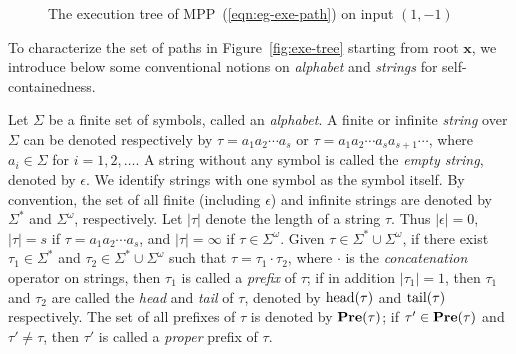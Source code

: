 \documentclass{article}
\newcommand{\head}{{\rm head}}
\newcommand{\tail}{{\rm tail}}
\newcommand{\xx}{\mathbf{x}}
\begin{document}
\begin{figure}
\begin{minipage}[t]{0.45\linewidth}

\caption{\small The execution tree of MPP~(\ref{eqn:eg-exe-path}) on input $(1,-1)$}\label{fig:exe-path}
\end{minipage}
\end{figure}

To characterize the set of paths in Figure~\ref{fig:exe-tree} starting from root $\xx$, we introduce below some conventional notions on \emph{alphabet} and \emph{strings} for self-containedness.

Let $\Sigma$ be a finite set of symbols, called an \emph{alphabet}. A finite or infinite \emph{string} over $\Sigma$ can be denoted respectively by $\tau=a_1a_2 \cdots a_s$ or $\tau=a_1a_2 \cdots a_s a_{s+1} \cdots$, where $a_i \in \Sigma$ for $i=1,2,\ldots$. A string without any symbol is called the \emph{empty string}, denoted by $\epsilon$. We identify strings with one symbol as the symbol itself. By convention, the set of all finite (including $\epsilon$) and infinite strings are denoted by $\Sigma^*$ and $\Sigma^{\omega}$, respectively.
Let $|\tau|$ denote the length of a string $\tau$. Thus $|\epsilon|=0$, $|\tau|=s$ if $\tau=a_1 a_2 \cdots a_s$, and $|\tau|=\infty$ if $\tau \in \Sigma^{\omega}$. Given $\tau \in \Sigma^* \cup \Sigma^{\omega}$, if there exist $\tau_1 \in \Sigma^*$ and $\tau_2 \in \Sigma^* \cup \Sigma^{\omega}$ such that $\tau = \tau_1 \cdot \tau_2$, where $\cdot$ is the \emph{concatenation} operator on strings, then $\tau_1$ is called a \emph{prefix} of $\tau$; if in addition $|\tau_1|=1$, then $\tau_1$ and $\tau_2$ are called the \emph{head} and \emph{tail} of $\tau$, denoted by $\head(\tau)$ and $\tail(\tau)$ respectively. The set of all prefixes of $\tau$ is denoted by ${\bf Pre}(\tau)$; if $\tau' \in {\bf Pre} (\tau)$ and $\tau' \neq \tau$, then $\tau'$ is called a \emph{proper} prefix of $\tau$.
\end{document}
